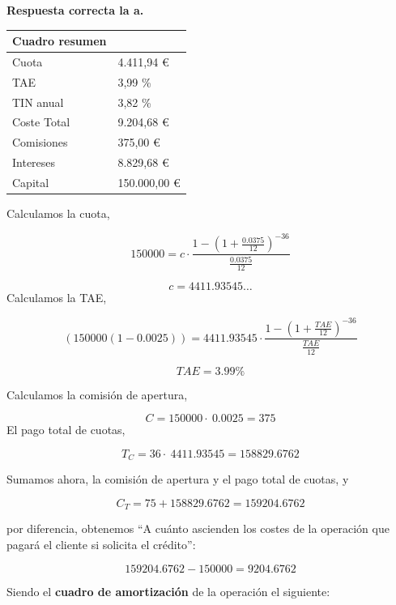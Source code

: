 \documentclass[
  letterpaper,
  DIV=11,
  numbers=noendperiod]{scrartcl}
\begin{document}
\begin{tcolorbox}[enhanced jigsaw, colframe=quarto-callout-tip-color-frame, opacityback=0, opacitybacktitle=0.6, colback=white, leftrule=.75mm, bottomtitle=1mm, colbacktitle=quarto-callout-tip-color!10!white, coltitle=black, toprule=.15mm, left=2mm, breakable, toptitle=1mm, titlerule=0mm, title=\textcolor{quarto-callout-tip-color}{\faLightbulb}\hspace{0.5em}{Solución}, arc=.35mm, rightrule=.15mm, bottomrule=.15mm]

\textbf{Respuesta correcta la a.}

\begin{longtable}[]{@{}ll@{}}
\toprule\noalign{}
Cuadro resumen & \\
\midrule\noalign{}
\endhead
\bottomrule\noalign{}
\endlastfoot
Cuota & 4.411,94 € \\
TAE & 3,99 \% \\
TIN anual & 3,82 \% \\
Coste Total & 9.204,68 € \\
Comisiones & 375,00 € \\
Intereses & 8.829,68 € \\
Capital & 150.000,00 € \\
\end{longtable}

Calculamos la cuota,

\[150000=c\cdot\frac{1-\left(1+\frac{0.0375}{12}\right)^{-36}}{\frac{0.0375}{12}}\]

\[c=4411.93545\dots \] Calculamos la TAE,

\[(150000(1-0.0025))=4411.93545\cdot\frac{1-\left(1+\frac{TAE}{12}\right)^{-36}}{\frac{TAE}{12}}\]

\[TAE=3.99\% \]

Calculamos la comisión de apertura,

\[C=150000\cdot \:0.0025=375\] El pago total de cuotas,

\[T_C= 36\cdot \:4411.93545=158829.6762\]

Sumamos ahora, la comisión de apertura y el pago total de cuotas, y

\[C_T=75+158829.6762=159204.6762\]

por diferencia, obtenemos ``A cuánto ascienden los costes de la
operación que pagará el cliente si solicita el crédito'':

\[159204.6762-150000=9204.6762\]

Siendo el \textbf{cuadro de amortización} de la operación el siguiente:


\end{tcolorbox}
\end{document}
